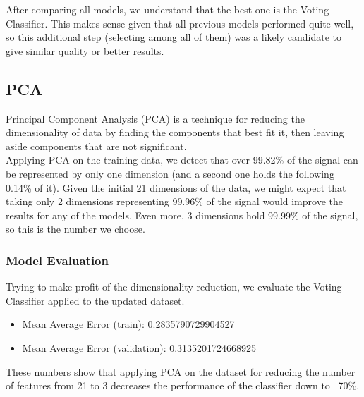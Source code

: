 After comparing all models, we understand that the best one is the Voting Classifier.
This makes sense given that all previous models performed quite well, so this additional step (selecting among all of them) was a likely candidate to give similar quality or better results.

\subsection{PCA}
Principal Component Analysis (PCA) is a technique for reducing the dimensionality of data by finding the components that best fit it, then leaving aside components that are not significant.\\
Applying PCA on the training data, we detect that over 99.82\% of the signal can be represented by only one dimension (and a second one holds the following 0.14\% of it).
Given the initial 21 dimensions of the data, we might expect that taking only 2 dimensions representing 99.96\% of the signal would improve the results for any of the models.
Even more, 3 dimensions hold 99.99\% of the signal, so this is the number we choose.

\subsubsection{Model Evaluation}
Trying to make profit of the dimensionality reduction, we evaluate the Voting Classifier applied to the updated dataset.
\begin{itemize}
    \item Mean Average Error (train): 0.2835790729904527
    \item Mean Average Error (validation): 0.3135201724668925
\end{itemize}
These numbers show that applying PCA on the dataset for reducing the number of features from 21 to 3 decreases the performance of the classifier down to ~70\%.
